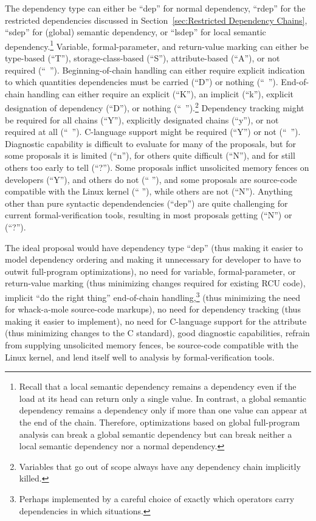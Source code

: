 \documentclass[letterpaper,twocolumn,10pt]{article}
\begin{document}
The dependency type can either be ``dep'' for normal dependency,
``rdep'' for the restricted dependencies discussed in
Section~\ref{sec:Restricted Dependency Chains},
``sdep'' for (global) semantic dependency, or ``lsdep'' for local
semantic dependency.\footnote{
	Recall that a local semantic dependency remains a dependency
	even if the  load at its head can return
	only a single value.
	In contrast, a global semantic dependency remains a dependency
	only if more than one value can appear at the end of the chain.
	Therefore, optimizations based on global full-program analysis
	can break a global semantic dependency
	but can break neither a local semantic dependency nor a
	normal dependency.}
Variable, formal-parameter, and return-value marking can either be
type-based (``T''),
storage-class-based (``S''),
attribute-based (``A''),
or not required (``~'').
Beginning-of-chain handling can either require explicit indication to
which quantities dependencies must be carried (``D'') or
nothing (``~'').
End-of-chain handling can either require an explicit
 (``K''), an implicit  (``k''),
explicit designation of dependency (``D''), or
nothing (``~'').\footnote{
	Variables that go out of scope always have any dependency chain
	implicitly killed.}
Dependency tracking might be required for all chains (``Y''),
explicitly designated chains (``y''), or not required at all (``~'').
C-language  support might be required (``Y'')
or not (``~'').
Diagnostic capability is difficult to evaluate for many of the proposals,
but for some proposals it is limited (``n''),
for others quite difficult (``N''), and
for still others too early to tell (``?'').
Some proposals inflict unsolicited memory fences on developers (``Y''),
and others do not (`` ''), and
some proposals are source-code compatible with the Linux kernel (`` ''),
while others are not (``N'').
Anything other than pure syntactic dependendencies (``dep'') are quite
challenging for current formal-verification tools, resulting in most
proposals getting (``N'') or (``?'').

The ideal proposal would have dependency type ``dep''
(thus making it easier to model dependency ordering and making it
unnecessary for developer to have to outwit full-program optimizations),
no need for variable, formal-parameter, or return-value marking
(thus minimizing changes required for existing RCU code),
implicit ``do the right thing'' end-of-chain handling,\footnote{
	Perhaps implemented by a careful choice of exactly which
	operators carry dependencies in which situations.}
(thus minimizing the need for whack-a-mole source-code markups),
no need for dependency tracking
(thus making it easier to implement),
no need for C-language support for the  attribute
(thus minimizing changes to the C standard),
good diagnostic capabilities, refrain from supplying
unsolicited memory fences, be source-code compatible with the
Linux kernel, and lend itself well to analysis by formal-verification
tools.
\end{document}
